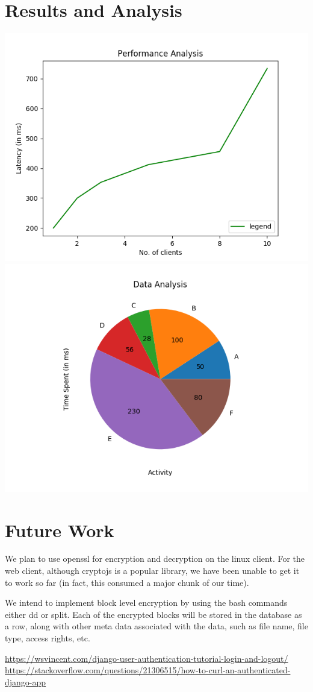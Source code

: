 \documentclass[a4paper]{article}
\begin{document}
\section{Results and Analysis}
\includegraphics[width=1\textwidth]{plot1.png} \\
\includegraphics[width=1\textwidth]{plot2.png}

\section{Future Work}
 We plan to use openssl for encryption and decryption on the linux client. For the web client, although cryptojs is a popular library, we have been unable to get it to work so far (in fact, this consumed a major chunk of our time).
 
 \noindent We intend to implement block level encryption by using the bash commands either dd or split. Each of the encrypted blocks will be stored in the database as a row, along with other meta data associated with the data, such as file name, file type, access rights, etc.

\begin{thebibliography}{}
\url{https://wsvincent.com/django-user-authentication-tutorial-login-and-logout/}
\url{https://stackoverflow.com/questions/21306515/how-to-curl-an-authenticated-django-app}
\end{thebibliography}
\end{document}
